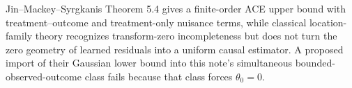 Jin--Mackey--Syrgkanis Theorem 5.4 gives a finite-order ACE upper bound with treatment--outcome and treatment-only nuisance terms, while classical location-family theory recognizes transform-zero incompleteness but does not turn the zero geometry of learned residuals into a uniform causal estimator. A proposed import of their Gaussian lower bound into this note's simultaneous bounded-observed-outcome class fails because that class forces \(\theta_0=0\).